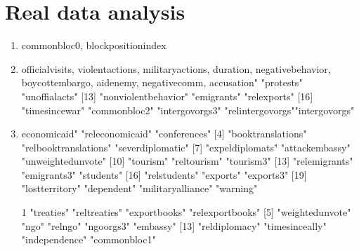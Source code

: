 \documentclass[11pt]{article}
\theoremstyle{plain}
\theoremstyle{definition}
\begin{document}
\section{Real data analysis}
\begin{enumerate}
\item  commonbloc0, blockpositionindex
\item 
officialvisits, violentactions, militaryactions, duration, negativebehavior, boycottembargo, aidenemy, negativecomm, accusation"         "protests"           "unoffialacts"      
[13] "nonviolentbehavior" "emigrants"          "relexports"        
[16] "timesincewar"       "commonbloc2"         "intergovorgs3" "relintergovorgs""intergovorgs" 
\item economicaid"         "releconomicaid"      "conferences"        
 [4] "booktranslations"    "relbooktranslations" "severdiplomatic"    
 [7] "expeldiplomats"      "attackembassy"       "unweightedunvote"   
[10] "tourism"             "reltourism"          "tourism3"           
[13] "relemigrants"        "emigrants3"          "students"           
[16] "relstudents"         "exports"             "exports3"           
[19] "lostterritory"       "dependent"           "militaryalliance"   "warning"    
\item 
 [1] "treaties"        "reltreaties"     "exportbooks"     "relexportbooks" 
 [5] "weightedunvote"    "ngo"            "relngo"          "ngoorgs3"        "embassy"        
[13] "reldiplomacy"    "timesinceally"   "independence"    "commonbloc1"   
\end{enumerate}




\end{document}
